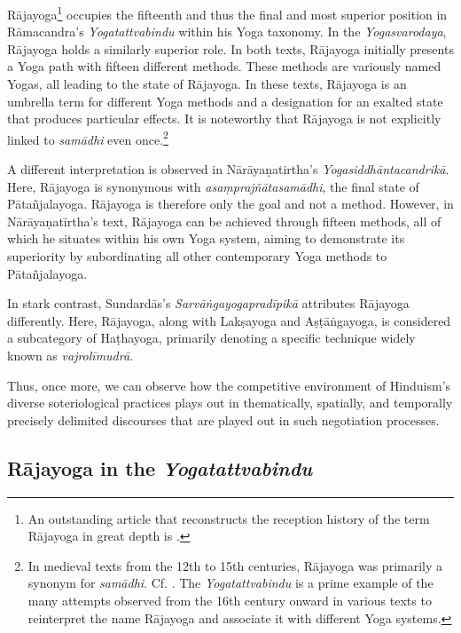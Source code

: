 Rājayoga\footnote{An outstanding article that reconstructs the reception history of the term Rājayoga in great depth is \cite{birch2014}.} occupies the fifteenth and thus the final and most superior position in Rāmacandra's \emph{Yogatattvabindu} within his Yoga taxonomy. In the \textit{Yogasvarodaya}, Rājayoga holds a similarly superior role. In both texts, Rājayoga initially presents a Yoga path with fifteen different methods. These methods are variously named Yogas, all leading to the state of Rājayoga. In these texts, Rājayoga is an umbrella term for different Yoga methods and a designation for an exalted state that produces particular effects. It is noteworthy that Rājayoga is not explicitly linked to \textit{samādhi} even once.\footnote{In medieval texts from the 12th to 15th centuries, Rājayoga was primarily a synonym for \textit{samādhi}. Cf. \citeauthor[2014: 401]{birch2014}. The \emph{Yogatattvabindu} is a prime example of the many attempts observed from the 16th century onward in various texts to reinterpret the name Rājayoga and associate it with different Yoga systems.}

A different interpretation is observed in Nārāyaṇatirtha's \textit{Yogasiddhāntacandrikā}. Here, Rājayoga is synonymous with \textit{asaṃprajñātasamādhi}, the final state of Pātañjalayoga. Rājayoga is therefore only the goal and not a method. However, in Nārāyaṇatīrtha's text, Rājayoga can be achieved through fifteen methods, all of which he situates within his own Yoga system, aiming to demonstrate its superiority by subordinating all other contemporary Yoga methods to Pātañjalayoga.

In stark contrast, Sundardās’s \emph{Sarvāṅgayogapradīpikā} attributes Rājayoga differently. Here, Rājayoga, along with Lakṣayoga and Aṣṭāṅgayoga, is considered a subcategory of Haṭhayoga, primarily denoting a specific technique widely known as \textit{vajrolīmudrā}.

Thus, once more, we can observe how the competitive environment of Hinduism’s diverse soteriological practices plays out in thematically, spatially, and temporally precisely delimited discourses that are played out in such negotiation processes. 

\subsection{Rājayoga in the \emph{Yogatattvabindu}}

